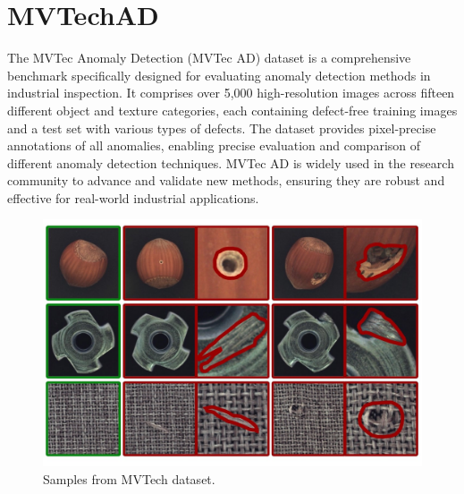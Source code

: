 \clearpage
\section{MVTechAD}
\label{mvtech}
The MVTec Anomaly Detection (MVTec AD) dataset is a comprehensive benchmark specifically designed for evaluating anomaly detection methods in industrial inspection. It comprises over 5,000 high-resolution images across fifteen different object and texture categories, each containing defect-free training images and a test set with various types of defects. The dataset provides pixel-precise annotations of all anomalies, enabling precise evaluation and comparison of different anomaly detection techniques. MVTec AD is widely used in the research community to advance and validate new methods, ensuring they are robust and effective for real-world industrial applications.

\begin{figure}[h]
	\begin{center}
		\includegraphics[width=0.7\linewidth]{Chapter_2/mvtec.jpg}
	\end{center}
	\caption{Samples from MVTech dataset.}
	\label{fig:cnn}
\end{figure}

